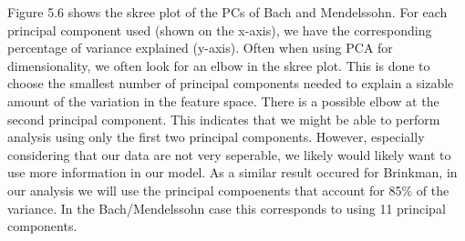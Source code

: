 \documentclass[12pt,twoside]{reedthesis}
\theoremstyle{definition}
\theoremstyle{definition}
\theoremstyle{definition}
\theoremstyle{remark}
\begin{document}
Figure 5.6 shows the skree plot of the PCs of Bach and Mendelssohn. For
each principal component used (shown on the x-axis), we have the
corresponding percentage of variance explained (y-axis). Often when
using PCA for dimensionality, we often look for an elbow in the skree
plot. This is done to choose the smallest number of principal components
needed to explain a sizable amount of the variation in the feature
space. There is a possible elbow at the second principal component. This
indicates that we might be able to perform analysis using only the first
two principal components. However, especially considering that our data
are not very seperable, we likely would likely want to use more
information in our model. As a similar result occured for Brinkman, in
our analysis we will use the principal compoenents that account for 85\%
of the variance. In the Bach/Mendelssohn case this corresponds to using
11 principal components.
\end{document}
